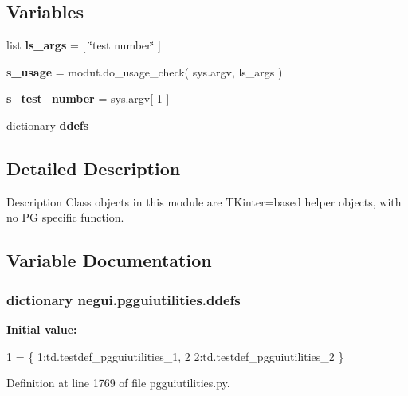 \subsection*{Variables}
\begin{DoxyCompactItemize}
\item 
list {\bfseries ls\+\_\+args} = \mbox{[} \char`\"{}test number\char`\"{} \mbox{]}\hypertarget{namespacenegui_1_1pgguiutilities_a46e745e9f96185d89c4b1e47e9e9cfbe}{}\label{namespacenegui_1_1pgguiutilities_a46e745e9f96185d89c4b1e47e9e9cfbe}

\item 
{\bfseries s\+\_\+usage} = modut.\+do\+\_\+usage\+\_\+check( sys.\+argv, ls\+\_\+args )\hypertarget{namespacenegui_1_1pgguiutilities_ac555db6439aacbf9bbcf963914197974}{}\label{namespacenegui_1_1pgguiutilities_ac555db6439aacbf9bbcf963914197974}

\item 
{\bfseries s\+\_\+test\+\_\+number} = sys.\+argv\mbox{[} 1 \mbox{]}\hypertarget{namespacenegui_1_1pgguiutilities_a27a6c48cffe2fc5f9023b47cd8a33c45}{}\label{namespacenegui_1_1pgguiutilities_a27a6c48cffe2fc5f9023b47cd8a33c45}

\item 
dictionary {\bfseries ddefs}
\end{DoxyCompactItemize}


\subsection{Detailed Description}
\begin{DoxyVerb}Description
Class objects in this module are TKinter=based
helper objects, with no PG specific function.\end{DoxyVerb}
 

\subsection{Variable Documentation}
\subsubsection[{\texorpdfstring{ddefs}{ddefs}}]{\setlength{\rightskip}{0pt plus 5cm}dictionary negui.\+pgguiutilities.\+ddefs}\hypertarget{namespacenegui_1_1pgguiutilities_a6d79494ef4549443848626c0def2e0a6}{}\label{namespacenegui_1_1pgguiutilities_a6d79494ef4549443848626c0def2e0a6}
{\bfseries Initial value\+:}
\begin{DoxyCode}
1 = \{ 1:td.testdef\_pgguiutilities\_1,
2             2:td.testdef\_pgguiutilities\_2 \}
\end{DoxyCode}


Definition at line 1769 of file pgguiutilities.\+py.

